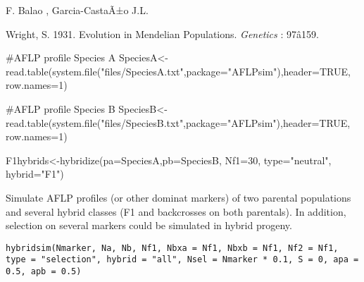 \documentclass[letterpaper]{book}
\begin{document}
%
\begin{Author}\relax
F. Balao , Garcia-CastaÃ±o J.L.
\end{Author}
%
\begin{References}\relax
Wright, S. 1931. Evolution in Mendelian Populations. \emph{Genetics} : 97â159. 
\end{References}
%
\begin{SeeAlso}\relax
{}
\end{SeeAlso}
%
\begin{Examples}
\begin{ExampleCode}
#AFLP profile Species A
SpeciesA<-read.table(system.file("files/SpeciesA.txt",package="AFLPsim"),header=TRUE, row.names=1)


#AFLP profile Species B
SpeciesB<-read.table(system.file("files/SpeciesB.txt",package="AFLPsim"),header=TRUE, row.names=1)

F1hybrids<-hybridize(pa=SpeciesA,pb=SpeciesB, Nf1=30, type="neutral", hybrid="F1")
\end{ExampleCode}
\end{Examples}
%
\begin{Description}\relax
Simulate AFLP profiles (or other dominat markers) of two parental populations and several hybrid classes (F1 and backcrosses on both parentals). In addition, selection on several markers could be simulated in hybrid progeny.  
\end{Description}
%
\begin{Usage}
\begin{verbatim}
hybridsim(Nmarker, Na, Nb, Nf1, Nbxa = Nf1, Nbxb = Nf1, Nf2 = Nf1, type = "selection", hybrid = "all", Nsel = Nmarker * 0.1, S = 0, apa = 0.5, apb = 0.5)
\end{verbatim}
\end{Usage}
%
\end{document}
